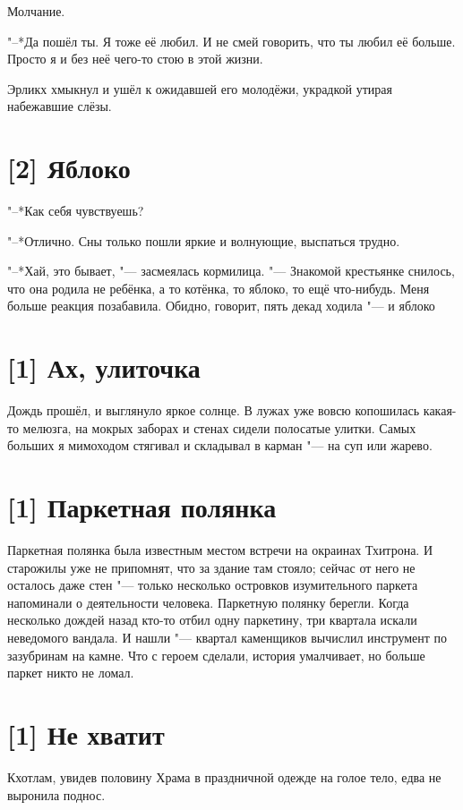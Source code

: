 Молчание.

"--*Да пошёл ты.
Я тоже её любил.
И не смей говорить, что ты любил её больше.
Просто я и без неё чего-то стою в этой жизни.

Эрликх хмыкнул и ушёл к ожидавшей его молодёжи, украдкой утирая набежавшие слёзы.

\section{[2] Яблоко}

"--*Как себя чувствуешь?

"--*Отлично.
Сны только пошли яркие и волнующие, выспаться трудно.

"--*Хай, это бывает, "--- засмеялась кормилица.
"--- Знакомой крестьянке снилось, что она родила не ребёнка, а то котёнка, то яблоко, то ещё что-нибудь.
Меня больше реакция позабавила.
Обидно, говорит, пять декад ходила "--- и яблоко\ldotst

\section{[1] Ах, улиточка}

Дождь прошёл, и выглянуло яркое солнце.
В лужах уже вовсю копошилась какая-то мелюзга, на мокрых заборах и стенах сидели полосатые улитки.
Самых больших я мимоходом стягивал и складывал в карман "--- на суп или жарево.

\section{[1] Паркетная полянка}

Паркетная полянка была известным местом встречи на окраинах Тхитрона.
И старожилы уже не припомнят, что за здание там стояло;
сейчас от него не осталось даже стен "--- только несколько островков изумительного паркета напоминали о деятельности человека.
Паркетную полянку берегли.
Когда несколько дождей назад кто-то отбил одну паркетину, три квартала искали неведомого вандала.
И нашли "--- квартал каменщиков вычислил инструмент по зазубринам на камне.
Что с героем сделали, история умалчивает, но больше паркет никто не ломал.

\section{[1] Не хватит}

Кхотлам, увидев половину Храма в праздничной одежде на голое тело, едва не выронила поднос.


